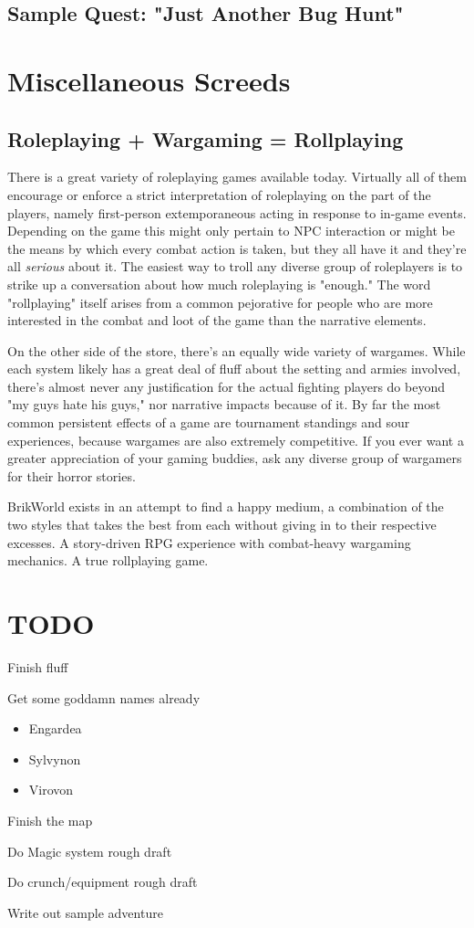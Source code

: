 \documentclass[12pt,a4paper,twocolumn]{article}
\begin{document}
\subsection{Sample Quest: "Just Another Bug Hunt"}

\section{Miscellaneous Screeds}
\subsection{Roleplaying + Wargaming = Rollplaying}
There is a great variety of roleplaying games available today.  Virtually all of them encourage or enforce a strict interpretation of roleplaying on the part of the players, namely first-person extemporaneous acting in response to in-game events.  Depending on the game this might only pertain to NPC interaction or might be the means by which every combat action is taken, but they all have it and they're all {\em serious} about it.  The easiest way to troll any diverse group of roleplayers is to strike up a conversation about how much roleplaying is "enough."  The word "rollplaying" itself arises from a common pejorative for people who are more interested in the combat and loot of the game than the narrative elements.

On the other side of the store, there's an equally wide variety of wargames.  While each system likely has a great deal of fluff about the setting and armies involved, there's almost never any justification for the actual fighting players do beyond "my guys hate his guys," nor narrative impacts because of it.  By far the most common persistent effects of a game are tournament standings and sour experiences, because wargames are also extremely competitive.  If you ever want a greater appreciation of your gaming buddies, ask any diverse group of wargamers for their horror stories.

BrikWorld exists in an attempt to find a happy medium, a combination of the two styles that takes the best from each without giving in to their respective excesses.  A story-driven RPG experience with combat-heavy wargaming mechanics.  A true rollplaying game.

\section {TODO}

Finish fluff

Get some goddamn names already

\begin{itemize}
\item Engardea
\item Sylvynon
\item Virovon
\end{itemize}


Finish the map

Do Magic system rough draft

Do crunch/equipment rough draft

Write out sample adventure
\end{document}
